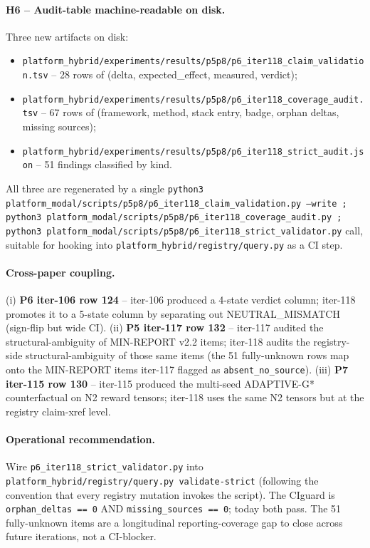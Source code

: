 \paragraph{H6 -- Audit-table machine-readable on disk.}
Three new artifacts on disk:
\begin{itemize}
\item \texttt{platform_hybrid/experiments/results/p5p8/p6\_iter118\_claim\_validation.tsv}
      -- 28 rows of (delta, expected\_effect, measured, verdict);
\item \texttt{platform_hybrid/experiments/results/p5p8/p6\_iter118\_coverage\_audit.tsv}
      -- 67 rows of (framework, method, stack entry, badge, orphan deltas,
      missing sources);
\item \texttt{platform_hybrid/experiments/results/p5p8/p6\_iter118\_strict\_audit.json}
      -- 51 findings classified by kind.
\end{itemize}
All three are regenerated by a single
\texttt{python3 platform_modal/scripts/p5p8/p6\_iter118\_claim\_validation.py --write ;
python3 platform_modal/scripts/p5p8/p6\_iter118\_coverage\_audit.py ;
python3 platform_modal/scripts/p5p8/p6\_iter118\_strict\_validator.py} call, suitable for
hooking into \texttt{platform_hybrid/registry/query.py} as a CI step.

\paragraph{Cross-paper coupling.}
(i) \textbf{P6 iter-106 row 124} -- iter-106 produced a 4-state verdict
column; iter-118 promotes it to a 5-state column by separating out
NEUTRAL\_MISMATCH (sign-flip but wide CI). (ii) \textbf{P5 iter-117 row
132} -- iter-117 audited the structural-ambiguity of MIN-REPORT v2.2 items;
iter-118 audits the registry-side structural-ambiguity of those same
items (the 51 fully-unknown rows map onto the MIN-REPORT items iter-117
flagged as \texttt{absent\_no\_source}). (iii) \textbf{P7 iter-115 row 130}
-- iter-115 produced the multi-seed ADAPTIVE-G* counterfactual on N2
reward tensors; iter-118 uses the same N2 tensors but at the registry
claim-xref level.

\paragraph{Operational recommendation.}
Wire \texttt{p6\_iter118\_strict\_validator.py} into
\texttt{platform_hybrid/registry/query.py validate-strict} (following the convention that
every registry mutation invokes the script). The CIguard is
\texttt{orphan\_deltas == 0} AND \texttt{missing\_sources == 0}; today
both pass. The 51 fully-unknown items are a longitudinal reporting-coverage
gap to close across future iterations, not a CI-blocker.
